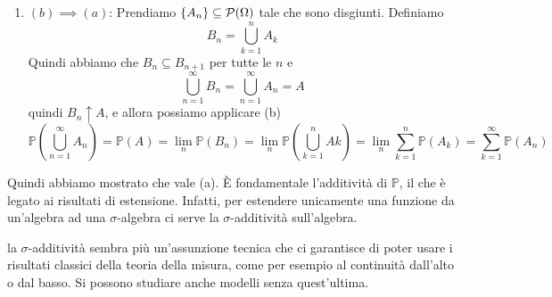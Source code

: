 \documentclass[a4paper]{article}
\begin{document}
\begin{snippetproof}{}
\begin{enumerate}
            per tutte le \(n > 1\).
            Il diagramma di Wenn forma delle corone annidate.
            Per definizione di \(A_n \uparrow A\),
            \(\{B_n\}\) sono disgiunti e \[
                \bigcup_{n=1}^\infty B_n = \bigcup_{n=1}^\infty A_n = A
            \]
            Quindi concludiamo che
            \begin{align*}
                \mathbb P(A) &= \mathbb P\left(
                    \bigcup_{n=1}^\infty A_n
                \right)
                = \mathbb P\left(
                    \bigcup_{n=1}^\infty B_n
                \right)
                = \sum_{n=1}^\infty \mathbb P(B_n)
                = \lim_n \sum_{k=1}^n \mathbb P(B_k) \\
                &= \lim_n \sum_{k=1}^n \mathbb P(A_k / A_{k-1})
                = \lim_n \sum_{k=1}^n \mathbb P(A_k) - \mathbb P(A_{k-1})
                = \lim_n \mathbb P(A_n)
            \end{align*}
            Quindi abbiamo dimostrato che vale (b).
        \item \emph{\((b) \implies (a)\)}:
            Prendiamo \(\{A_n\} \subseteq \mathcal P(\Omega)\)
            tale che sono disgiunti.
            Definiamo \[
                B_n = \bigcup_{k=1}^n A_k
            \]
            Quindi abbiamo che \(B_n \subseteq B_{n+1}\)
            per tutte le \(n\) e \[
                \bigcup_{n=1}^\infty B_n
                = \bigcup_{n=1}^\infty A_n
                = A
            \]
            quindi \(B_n \uparrow A\),
            e allora possiamo applicare (b)
            \[
                \mathbb P \left(
                    \bigcup_{n=1}^\infty A_n
                \right)
                = \mathbb P(A)
                = \lim_n \mathbb P(B_n)
                = \lim_n \mathbb P \left(
                    \bigcup_{k=1}^n Ak
                \right)
                = \lim_n \sum_{k=1}^n \mathbb P(A_k)
                = \sum_{k=1}^\infty \mathbb P(A_n)
            \]
    \end{enumerate}
    Quindi abbiamo mostrato che vale (a).
    È fondamentale l'additività di \(\mathbb P\),
    il che è legato ai risultati di estensione.
    Infatti, per estendere unicamente una funzione da un'algebra
    ad una \(\sigma\)-algebra ci serve la \(\sigma\)-additività sull'algebra.
\end{snippetproof}

la \(\sigma\)-additività sembra più un'assunzione tecnica che ci garantisce di poter usare i risultati classici della
teoria della misura, come per esempio al continuità dall'alto o dal basso.
Si possono studiare anche modelli senza quest'ultima.
\end{document}
